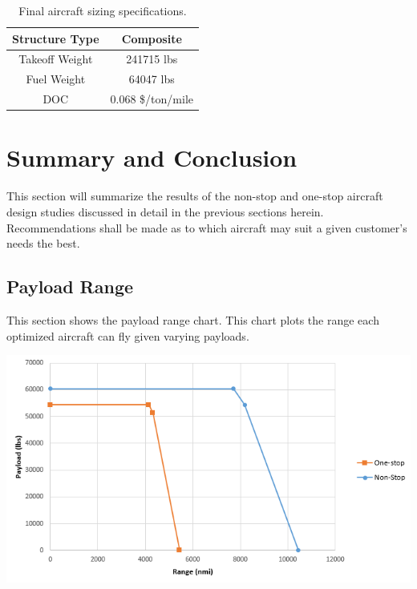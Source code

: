 \documentclass{article}
\begin{document}
\begin{table}[ht]
\begin{tabular}{|c|c|}
                Structure Type                     & Composite                           \\ \hline
                \rowcolor[HTML]{C0C0C0}
                Takeoff Weight                     & 241715 lbs                          \\ \hline
                \rowcolor[HTML]{FFFFFF}
                Fuel Weight                        & 64047 lbs                           \\ \hline
                \rowcolor[HTML]{C0C0C0}
                DOC                                & 0.068 \$/ton/mile                   \\ \hline
            \end{tabular}
        \caption{Final aircraft sizing specifications.}
        \end{table}

    \section{Summary and Conclusion}
    \label{sec:conclusion}
        \begin{flushleft}
            This section will summarize the results of the non-stop and one-stop
            aircraft design studies discussed in detail in the previous sections
            herein. Recommendations shall be made as to which aircraft may suit a
            given customer's needs the best.
        \end{flushleft}

    \subsection{Payload Range}
    \label{sec:PR}
    \begin{flushleft}
        This section shows the payload range chart. This chart plots the range
        each optimized aircraft can fly given varying payloads.
    \end{flushleft}

    \begin{center}
        \includegraphics[scale=0.6]{Payload Range.PNG}
        \label{fig:PR}
    \end{center}
\end{document}

